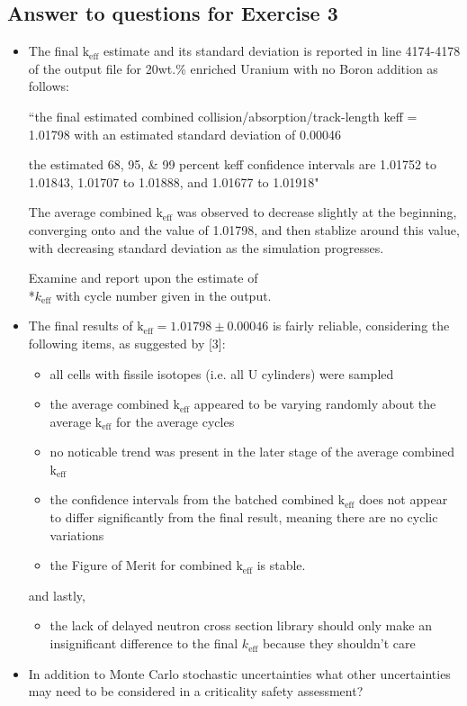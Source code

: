 \documentclass[a4paper, 12pt]{article}
\begin{document}
\subsection{Answer to questions for Exercise 3}\label{Ex3Ans}
\begin{itemize}
	\item The final $\text{k}_{\text{eff}}$ estimate and its standard deviation is reported in line 4174-4178 of the output file for 20wt.\% enriched Uranium with no Boron addition as follows:
	
	``the final estimated combined collision/absorption/track-length keff = 1.01798 with an estimated standard deviation of 0.00046

 	the estimated 68, 95, \& 99 percent keff confidence intervals are 1.01752 to 1.01843, 1.01707 to 1.01888, and 1.01677 to 1.01918"

 	The average combined $\text{k}_{\text{eff}}$ was observed to decrease slightly at the beginning, converging onto and the value of 1.01798, and then stablize around this value, with decreasing standard deviation as the simulation progresses.

	Examine and report upon the estimate of \\*$k_{\text{eff}}$ with cycle number given in the output.
	\item The final results of $\text{k}_{\text{eff}} = 1.01798 \pm 0.00046$ is fairly reliable, considering the following items, as suggested by [3]:
	\begin{itemize}
		\item all cells with fissile isotopes (i.e. all U cylinders) were sampled
		\item the average combined $\text{k}_{\text{eff}}$ appeared to be varying randomly about the average $\text{k}_{\text{eff}}$ for the average cycles
		\item no noticable trend was present in the later stage of the average combined $\text{k}_{\text{eff}}$
		\item the confidence intervals from the batched combined $\text{k}_{\text{eff}}$ does not appear to differ significantly from the final result, meaning there are no cyclic variations
		\item the Figure of Merit for combined $\text{k}_{\text{eff}}$ is stable.
	\end{itemize}
	and lastly,
	\begin{itemize}
		\item the lack of delayed neutron cross section library should only make an insignificant difference to the final $k_{\text{eff}}$ because they shouldn't care
	\end{itemize}
	\item In addition to Monte Carlo stochastic uncertainties what other uncertainties may need to be considered in a criticality safety assessment?
\end{itemize}
\end{document}
